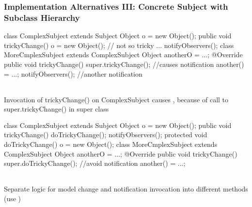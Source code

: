\subsubsection{Implementation Alternatives III: Concrete Subject with Subclass Hierarchy}
\begin{codeBlock}{}
    class ComplexSubject extends Subject{
        Object o = new Object();
        public void trickyChange(){
            o = new Object(); // not so tricky ...
            notifyObservers();
        }
    }
    class MoreCmplexSubject extends ComplexSubject{
        Object anotherO = ...;
        @Override
        public void trickyChange(){
            super.trickyChange(); //causes notification
            another() = ...;
            notifyObservers(); //another notification
        }
    }
\end{codeBlock}
\\
Invocation of trickyChange() on ComplexSubject causes , because of call to super.trickyChange() in super class
\begin{codeBlock}{}
    class ComplexSubject extends Subject{
        Object o = new Object();
        public void trickyChange(){
            doTrickyChange();
            notifyObservers();
        }
        protected void doTrickyChange(){
            o = new Object();
        }
    }
    class MoreCmplexSubject extends ComplexSubject{
        Object anotherO = ...;
        @Override
        public void trickyChange(){
            super.doTrickyChange(); //avoid notification
            another() = ...;
        }
    }
\end{codeBlock}
\\
Separate logic for model change and notification invocation into different methods (use )
